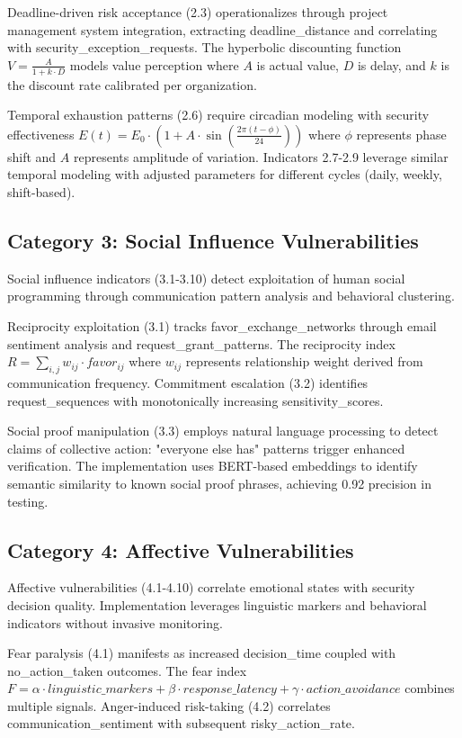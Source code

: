 \documentclass[10pt, twocolumn]{article}
\begin{document}
Deadline-driven risk acceptance (2.3) operationalizes through project management system integration, extracting deadline\_distance and correlating with security\_exception\_requests. The hyperbolic discounting function $V = \frac{A}{1 + k \cdot D}$ models value perception where $A$ is actual value, $D$ is delay, and $k$ is the discount rate calibrated per organization.

Temporal exhaustion patterns (2.6) require circadian modeling with security effectiveness $E(t) = E_0 \cdot (1 + A \cdot \sin(\frac{2\pi(t - \phi)}{24}))$ where $\phi$ represents phase shift and $A$ represents amplitude of variation. Indicators 2.7-2.9 leverage similar temporal modeling with adjusted parameters for different cycles (daily, weekly, shift-based).

\subsection{Category 3: Social Influence Vulnerabilities}

Social influence indicators (3.1-3.10) detect exploitation of human social programming through communication pattern analysis and behavioral clustering.

Reciprocity exploitation (3.1) tracks favor\_exchange\_networks through email sentiment analysis and request\_grant\_patterns. The reciprocity index $R = \sum_{i,j} w_{ij} \cdot favor_{ij}$ where $w_{ij}$ represents relationship weight derived from communication frequency. Commitment escalation (3.2) identifies request\_sequences with monotonically increasing sensitivity\_scores.

Social proof manipulation (3.3) employs natural language processing to detect claims of collective action: "everyone else has" patterns trigger enhanced verification. The implementation uses BERT-based embeddings to identify semantic similarity to known social proof phrases, achieving 0.92 precision in testing.

\subsection{Category 4: Affective Vulnerabilities}

Affective vulnerabilities (4.1-4.10) correlate emotional states with security decision quality. Implementation leverages linguistic markers and behavioral indicators without invasive monitoring.

Fear paralysis (4.1) manifests as increased decision\_time coupled with no\_action\_taken outcomes. The fear index $F = \alpha \cdot linguistic\_markers + \beta \cdot response\_latency + \gamma \cdot action\_avoidance$ combines multiple signals. Anger-induced risk-taking (4.2) correlates communication\_sentiment with subsequent risky\_action\_rate.
\end{document}
